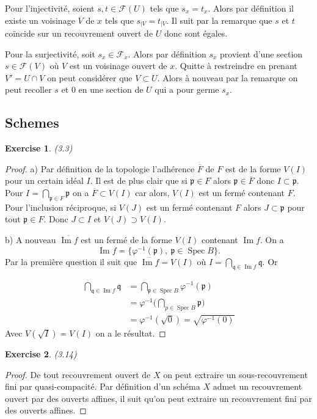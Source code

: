 \documentclass[A4, 11pt]{article}
\newtheorem{exer}{Exercise}
\def\Im{  \operatorname{Im} }
\def\Spec{ \operatorname{Spec}}
\begin{document}
Pour l'injectivité, soient $s,t\in \mathcal{F}(U)$ tels que $s_x=t_x$. Alors par définition il existe un voisinage $V$ de $x$ tels que $s_{|V}=t_{|V}$. Il suit par la remarque que $s$ et $t$ coïncide sur un recouvrement ouvert de $U$ donc sont égales.

Pour la surjectivité, soit $s_x\in \mathcal{F}_x$. Alors par définition $s_x$ provient d'une section $s\in \mathcal{F}(V)$ où $V$ est un voisinage ouvert de $x$. Quitte à restreindre en prenant $V'=U\cap V$ on peut considérer que $V\subset U$. Alors à nouveau par la remarque on peut recoller $s$ et $0$ en une section de $U$ qui a pour germe $s_x$.
\subsection{Schemes}
\begin{exer}(3.3)
\end{exer}
\begin{proof}
a) Par définition de la topologie l'adhérence $\overline{F}$ de $F$ est de la forme $V(I)$ pour un certain idéal $I$. Il est de plus clair que si $\mathfrak{p}\in F$ alors $\mathfrak{p}\in \overline{F}$ donc $I\subset \mathfrak{p}$. Pour $I=\bigcap\limits_{\mathfrak{p}\in F} \mathfrak{p}$ on a $\overline{F}\subset V(I)$ car alors, $V(I)$ est un fermé contenant $F$. Pour l'inclusion réciproque, si $V(J)$ est un fermé contenant $F$ alors $J\subset \mathfrak{p}$ pour tout $\mathfrak{p}\in F$. Donc $J\subset I$ et $V(J)\supset V(I)$.

b) A nouveau $\overline{\Im f}$ est un fermé de la forme $V(I)$ contenant $\Im f$. On a 
$$\Im f= \{\varphi^{-1}(\mathfrak{p}),~ \mathfrak{p}\in \Spec B\}.$$
Par la première question il suit que $\overline{\Im f}=V(I)$ où $I=\bigcap\limits_{\mathfrak{q}\in \Im f} \mathfrak{q}$. Or

\begin{align*}
\bigcap\limits_{\mathfrak{q}\in \Im f} \mathfrak{q} & =\bigcap\limits_{\mathfrak{p}\in \Spec B} \varphi^{-1}(\mathfrak{p}) \\
& =\varphi^{-1} \big( \bigcap\limits_{p\in \Spec B} \mathfrak{p} \big) \\
&=\varphi^{-1}( \sqrt{0})=\sqrt{\varphi^{-1}(0)}
\end{align*}
Avec $V(\sqrt{I})=V(I)$ on a le résultat.
\end{proof}
\begin{exer}(3.14)
\end{exer}
\begin{proof}
De tout recouvrement ouvert de $X$ on peut extraire un sous-recouvrement fini par quasi-compacité. Par définition d'un schéma $X$ admet un recouvrement ouvert par des ouverts affines, il suit qu'on peut extraire un recouvrement fini par des ouverts affines.
\end{proof}
\end{document}
